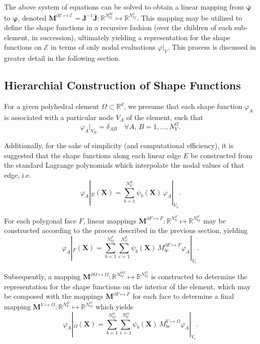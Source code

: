 	The above system of equations can be solved to obtain a linear mapping from $\bar{\boldsymbol{\varphi}}$ to $\boldsymbol{\varphi}$, denoted $\mathbf{M}^{\partial \mathcal{E} \mapsto \mathcal{E}} = \mathbf{J}^{-1} \bar{\mathbf{J}} : \mathbb{R}^{N^{\partial \mathcal{E}}_{bf}} \mapsto \mathbb{R}^{N^{\mathcal{E}}_{bf}}$. This mapping may be utilized to define the shape functions in a recursive fashion (over the children of each sub-element, in succession), ultimately yielding a representation for the shape functions on $\mathcal{E}$ in terms of only nodal evaluations $\varphi|_{V}$. This process is discussed in greater detail in the following section.
	
\subsection*{Hierarchial Construction of Shape Functions}

	For a given polyhedral element $\Omega \subset \mathbb{R}^d$, we presume that each shape function $\varphi_A$ is associated with a particular node $V_A$ of the element, such that
	\begin{equation}
		\varphi_A |_{V_B} = \delta_{AB} \quad \forall A, \, B = 1, \ldots, N^{\Omega}_V.
	\end{equation}
	
	Additionally, for the sake of simplicity (and computational efficiency), it is suggested that the shape functions along each linear edge $E$ be constructed from the standard Lagrange polynomials which interpolate the nodal values of that edge, i.e.
	\begin{equation}
		\varphi_A |_{E} (\mathbf{X}) = \sum_{b = 1}^{N^E_V} \psi_b (\mathbf{X}) \, \varphi_A |_{V_b}.
	\end{equation}

	For each polygonal face $F$, linear mappings $\mathbf{M}^{\partial F \mapsto F} : \mathbb{R}^{N^{F}_{V}} \mapsto \mathbb{R}^{N^{F}_{bf}}$ may be constructed according to the process described in the previous section, yielding 
	\begin{equation}
		\varphi_A |_{F} (\mathbf{X}) = \sum_{b = 1}^{N^F_{bf}} \sum_{c = 1}^{N^F_{V}} \psi_b (\mathbf{X}) \, M^{\partial F \mapsto F}_{bc} \varphi_A |_{V_c}.
	\end{equation}

	Subsequently, a mapping $\mathbf{M}^{\partial \Omega \mapsto \Omega} : \mathbb{R}^{N^{\partial \Omega}_{bf}} \mapsto \mathbb{R}^{N^{\Omega}_{bf}}$ is constructed to determine the representation for the shape functions on the interior of the element, which may be composed with the mappings $\mathbf{M}^{\partial F \mapsto F}$ for each face to determine a final mapping $\mathbf{M}^{V \mapsto \Omega} : \mathbb{R}^{N^{\Omega}_{V}} \mapsto \mathbb{R}^{N^{\Omega}_{bf}}$ which yields
	\begin{equation}
		\varphi_A |_{\Omega} (\mathbf{X}) = \sum_{b = 1}^{N^\Omega_{bf}} \sum_{c = 1}^{N^\Omega_{V}} \psi_b (\mathbf{X}) \, M^{V \mapsto \Omega}_{bc} \varphi_A |_{V_c}.
		\label{eq:mapped_shape_functions}
	\end{equation}

